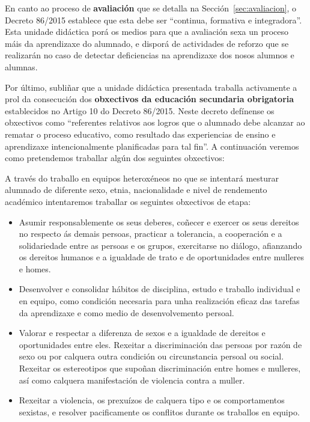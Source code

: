 En canto ao proceso de \textbf{avaliación} que se detalla na Sección~\ref{sec:avaliacion}, o Decreto 86/2015 establece que esta debe ser ``continua, formativa e integradora''.  Esta unidade didáctica porá os medios para que a avaliación sexa un proceso máis da aprendizaxe do alumnado, e disporá de actividades de reforzo que se realizarán no caso de detectar deficiencias na aprendizaxe dos nosos alumnos e alumnas.

Por último, subliñar que a unidade didáctica presentada traballa activamente a prol da consecución dos \textbf{obxectivos da educación secundaria obrigatoria} establecidos no Artigo 10 do Decreto 86/2015. Neste decreto defínense os obxectivos como ``referentes relativos aos logros que o alumnado debe alcanzar ao rematar o proceso educativo, como resultado das experiencias de ensino e aprendizaxe intencionalmente planificadas para tal fin''. A continuación veremos como pretendemos traballar algún dos seguintes obxectivos:

A través do traballo en equipos heteroxéneos no que se intentará mesturar alumnado de diferente sexo, etnia, nacionalidade e nivel de rendemento académico intentaremos traballar os seguintes obxectivos de etapa:

\begin{itemize}
    \item Asumir responsablemente os seus deberes, coñecer e exercer os seus dereitos no respecto ás demais persoas, practicar a tolerancia, a cooperación e a solidariedade entre as persoas e os grupos, exercitarse no diálogo, afianzando os dereitos humanos e a igualdade de trato e de oportunidades entre mulleres e homes.

    \item Desenvolver e consolidar hábitos de disciplina, estudo e traballo individual e en equipo, como condición necesaria para unha realización eficaz das tarefas da aprendizaxe e como medio de desenvolvemento persoal.

    \item Valorar e respectar a diferenza de sexos e a igualdade de dereitos e oportunidades entre eles. Rexeitar a discriminación das persoas por razón de sexo ou por calquera outra condición ou circunstancia persoal ou social. Rexeitar os estereotipos que supoñan discriminación entre homes e mulleres, así como calquera manifestación de violencia contra a muller.

    \item Rexeitar a violencia, os prexuízos de calquera tipo e os comportamentos sexistas, e resolver pacificamente os conflitos durante os traballos en equipo.
\end{itemize}

